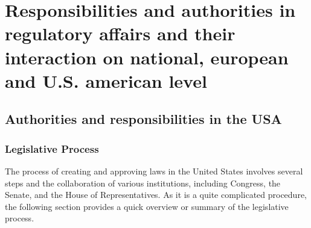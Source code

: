 \documentclass[11pt,a4paper,bibliography=totoc,listof=totoc,pointlessnumbers,open=any]{scrbook}
\begin{document}
\newpage
\chapter{Responsibilities and authorities in regulatory affairs and their interaction on national, european and U.S. american level}
\section{Authorities and responsibilities in the USA }
\subsection{Legislative Process}

The process of creating and approving laws in the United States involves several steps and the collaboration of various institutions, including Congress, the Senate, and the House of Representatives. As it is a quite complicated procedure, the following section provides a quick overview or summary of the legislative process.
\end{document}
